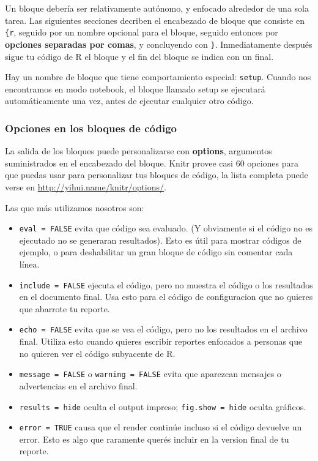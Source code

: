 \documentclass[
]{article}
\begin{document}
Un bloque debería ser relativamente autónomo, y enfocado alrededor de
una sola tarea. Las siguientes secciones decriben el encabezado de
bloque que consiste en
\texttt{\textasciigrave{}\textasciigrave{}\textasciigrave{}\{r}, seguido
por un nombre opcional para el bloque, seguido entonces por
\textbf{opciones separadas por comas}, y concluyendo con \texttt{\}}.
Inmediatamente después sigue tu código de R el bloque y el fin del
bloque se indica con un
\texttt{\textasciigrave{}\textasciigrave{}\textasciigrave{}} final.

Hay un nombre de bloque que tiene comportamiento especial:
\texttt{setup}. Cuando nos encontramos en modo notebook, el bloque
llamado setup se ejecutará automáticamente una vez, antes de ejecutar
cualquier otro código.

\subsubsection{Opciones en los bloques de
código}\label{opciones-en-los-bloques-de-cuxf3digo}

La salida de los bloques puede personalizarse con \textbf{options},
argumentos suministrados en el encabezado del bloque. Knitr provee casi
60 opciones para que puedas usar para personalizar tus bloques de
código, la lista completa puede verse en
\url{http://yihui.name/knitr/options/}.

Las que más utilizamos nosotros son:

\begin{itemize}
\item
  \texttt{eval\ =\ FALSE} evita que código sea evaluado. (Y obviamente
  si el código no es ejecutado no se generaran resultados). Esto es útil
  para mostrar códigos de ejemplo, o para deshabilitar un gran bloque de
  código sin comentar cada línea.
\item
  \texttt{include\ =\ FALSE} ejecuta el código, pero no muestra el
  código o los resultados en el documento final. Usa esto para el código
  de configuracion que no quieres que abarrote tu reporte.
\item
  \texttt{echo\ =\ FALSE} evita que se vea el código, pero no los
  resultados en el archivo final. Utiliza esto cuando quieres escribir
  reportes enfocados a personas que no quieren ver el código subyacente
  de R.
\item
  \texttt{message\ =\ FALSE} o \texttt{warning\ =\ FALSE} evita que
  aparezcan mensajes o advertencias en el archivo final.
\item
  \texttt{results\ =\ \textquotesingle{}hide\textquotesingle{}} oculta
  el output impreso;
  \texttt{fig.show\ =\ \textquotesingle{}hide\textquotesingle{}} oculta
  gráficos.
\item
  \texttt{error\ =\ TRUE} causa que el render continúe incluso si el
  código devuelve un error. Esto es algo que raramente querés incluir en
  la version final de tu reporte.
\end{itemize}
\end{document}
